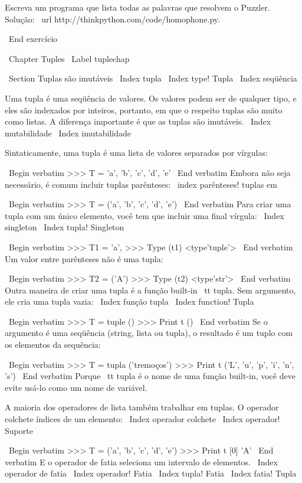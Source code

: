 \documentclass[10pt]{book}
\begin{document}
\begin {itemize}
{{{{{{{Escreva um programa que lista todas as palavras que resolvem o Puzzler.
Solução: \ url {http://thinkpython.com/code/homophone.py}.

\ End {} exercício



\ Chapter {} Tuples
\ Label {} tuplechap

\ Section {Tuplas são imutáveis}
\ Index {} tupla
\ Index {type! Tupla}
\ Index {seqüência}

Uma tupla é uma seqüência de valores. Os valores podem ser de qualquer tipo, e
eles são indexados por inteiros, portanto, em que o respeito tuplas são muito
como listas. A diferença importante é que as tuplas são imutáveis.
\ Index {} mutabilidade
\ Index {imutabilidade}

Sintaticamente, uma tupla é uma lista de valores separados por vírgulas:

\ Begin {verbatim}
>>> T = 'a', 'b', 'c', 'd', 'e'
\ End {verbatim}
%
Embora não seja necessário, é comum incluir tuplas
parênteses:
\ index {parênteses! tuplas em}

\ Begin {verbatim}
>>> T = ('a', 'b', 'c', 'd', 'e')
\ End {verbatim}
%
Para criar uma tupla com um único elemento, você tem que incluir uma final
vírgula:
\ Index {singleton}
\ Index {tupla! Singleton}

\ Begin {verbatim}
>>> T1 = 'a',
>>> Type (t1)
<type'tuple'>
\ End {verbatim}
%
Um valor entre parênteses não é uma tupla:

\ Begin {verbatim}
>>> T2 = ('A')
>>> Type (t2)
<type'str'>
\ End {verbatim}
%
Outra maneira de criar uma tupla é a função built-in {\ tt tupla}.
Sem argumento, ele cria uma tupla vazia:
\ Index {função tupla}
\ Index {function! Tupla}

\ Begin {verbatim}
>>> T = tuple ()
>>> Print t
()
\ End {verbatim}
%
Se o argumento é uma seqüência (string, lista ou tupla), o resultado
é um tuplo com os elementos da sequência:

\ Begin {verbatim}
>>> T = tupla ('tremoços')
>>> Print t
('L', 'u', 'p', 'i', 'n', 's')
\ End {verbatim}
%
Porque {\ tt tupla} é o nome de uma função built-in, você deve
evite usá-lo como um nome de variável.

A maioria dos operadores de lista também trabalhar em tuplas. O operador colchete
índices de um elemento:
\ Index {operador colchete}
\ Index {operador! Suporte}

\ Begin {verbatim}
>>> T = ('a', 'b', 'c', 'd', 'e')
>>> Print t [0]
'A'
\ End {verbatim}
%
E o operador de fatia seleciona um intervalo de elementos.
\ Index {operador de fatia}
\ Index {operador! Fatia}
\ Index {tupla! Fatia}
\ Index {fatia! Tupla}

}}}}}}}
\end{itemize}
\end{document}
